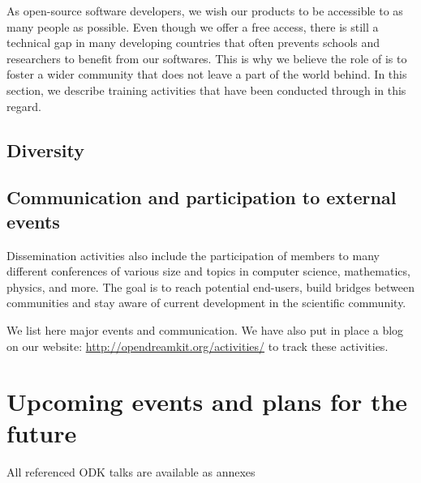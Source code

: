 \documentclass{deliverablereport}
\begin{document}
As open-source software developers, we wish our products
to be accessible to as many people as possible. Even though we offer
 a free access, there is still a technical gap in many 
developing countries that 
often prevents schools and researchers to benefit from our softwares.
This is why we believe the role of \ODK is to foster 
a wider community that does not leave a part of the world behind. In 
this section, we describe training activities that have been conducted 
through \ODK in this regard.







\subsection{Diversity}







\subsection{Communication and participation to external events}

Dissemination activities also include the participation of \ODK
members to many different conferences of various size and topics
in computer science, mathematics, physics, and more. The goal is
to reach potential end-users, build bridges between communities and stay aware 
of current development in the scientific community.

We list here major events and communication. We have also put in place
a blog on our website: \url{http://opendreamkit.org/activities/} to track
these activities.
























\section{Upcoming events and plans for the future}


\newpage\printbibliography

{\footnotesize All referenced ODK talks are available as annexes}
\end{document}
